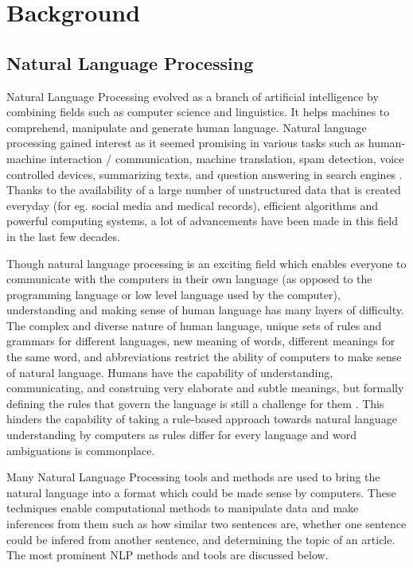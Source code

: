 
	\chapter{Background}
	
	\section{Natural Language Processing}
	
	Natural Language Processing evolved as a branch of artificial intelligence by combining fields such as computer science and linguistics. It helps machines to comprehend, manipulate and generate human language. Natural language processing gained interest as it seemed promising in various tasks such as human-machine interaction / communication, machine translation, spam detection, voice controlled devices, summarizing texts, and question answering in search engines \cite{nlp_appli}. Thanks to the availability of a large number of unstructured data that is created everyday (for eg. social media and medical records), efficient algorithms and powerful computing systems, a lot of advancements have been made in this field in the last few decades. 
	
	Though natural language processing is an exciting field which enables everyone to communicate with the computers in their own language (as opposed to the programming language or low level language used by the computer), understanding and making sense of human language has many layers of difficulty. The complex and diverse nature of human language, unique sets of rules and grammars for different languages, new meaning of words, different meanings for the same word, and abbreviations restrict the ability of computers to make sense of natural language. Humans have the capability of understanding, communicating, and construing very elaborate and subtle meanings, but formally defining the rules that govern the language is still a challenge for them \cite{goldberg2017neural}. This hinders the capability of taking a rule-based approach towards natural language understanding by computers as rules differ for every language and word ambiguations is commonplace. 
	
	Many Natural Language Processing tools and methods are used to bring the natural language into a format which could be made sense by computers. These techniques enable computational methods to manipulate data and make inferences from them such as how similar two sentences are, whether one sentence could be infered from another sentence, and determining the topic of an article. The most prominent NLP methods and tools are discussed below. 
	
